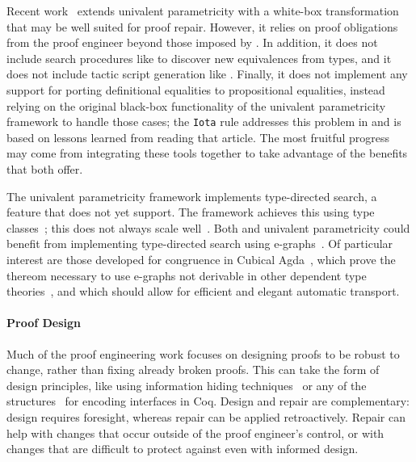 Recent work~\cite{tabareau2019marriage} extends univalent parametricity with 
a white-box transformation that may be well suited for proof repair.
However, it relies on proof obligations from the proof engineer beyond those imposed by \toolname.
In addition, it does not include search procedures like \toolname to discover new equivalences from types,
and it does not include tactic script generation like \toolname.
Finally, it does not implement any support for porting definitional equalities to propositional equalities,
instead relying on the original black-box functionality of the univalent parametricity framework to handle those cases;
the \lstinline{Iota} rule addresses this problem in \toolname and is based on lessons learned from reading that article.
The most fruitful progress may come from integrating these tools together to take advantage of the benefits that both offer.

The univalent parametricity framework implements type-directed search, a feature that \toolname does not yet support.
The framework achieves this using type classes~\cite{Sozeau2008}; this does not always scale well~\cite{tabareau2019marriage}.
Both \toolname and univalent parametricity could benefit from implementing type-directed search using e-graphs~\cite{egraph1}.
Of particular interest are those developed for congruence in Cubical Agda~\cite{egraph6},
which prove the thereom necessary to use e-graphs not derivable in other dependent type theories~\cite{egraph7},
and which should allow for efficient and elegant automatic transport.

\paragraph{Proof Design}

Much of the proof engineering work focuses on designing proofs
to be robust to change, rather than fixing already broken proofs.
This can take the form of design principles, like using 
information hiding techniques~\cite{Woos:2016:PCF:2854065.2854081, Klein:2014:CFV:2584468.2560537}
or any of the structures~\cite{Chrzaszcz2003, Sozeau2008, Saibi:PhD} for encoding interfaces in Coq.
Design and repair are complementary: design requires foresight, whereas repair can be applied retroactively.
Repair can help with changes that occur outside of the proof engineer's control,
or with changes that are difficult to protect against even with informed design.

